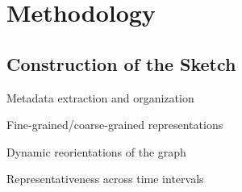 \section{Methodology}
\label{sec:methodology}

\subsection{Construction of the Sketch}
Metadata extraction and organization

Fine-grained/coarse-grained representations

Dynamic reorientations of the graph

Representativeness across time intervals


